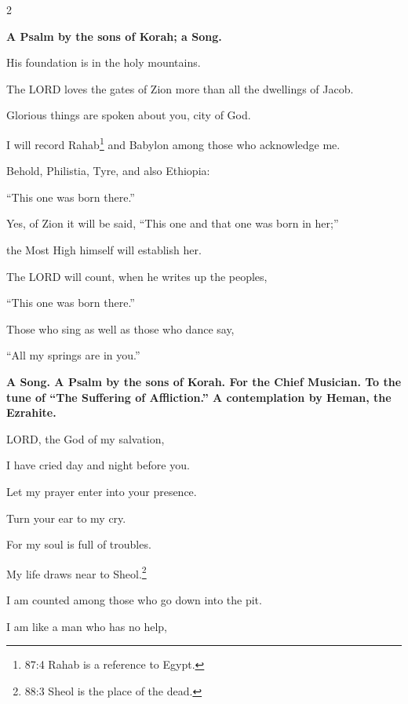\begin{multicols}{2}
	
	\mychapter{}\textbf{A Psalm by the sons of Korah; a Song.}
	
	\quad \myverse*{}His foundation is in the holy mountains.
	
	\myverse{}The LORD loves the gates of Zion more than all the
	dwellings of Jacob.
	
	\myverse{}Glorious things are spoken about you, city of God.
	
	\vspace{\baselineskip}
	
	\myverse{}I will record Rahab\footnote{87:4 Rahab is a reference to Egypt.} and Babylon among those who acknowledge me.
	
	Behold, Philistia, Tyre, and also Ethiopia:
	
	“This one was born there.”

	\vspace{\baselineskip}
	
	\myverse{}Yes, of Zion it will be said, “This one and that one was born
	in her;”
	
	the Most High himself will establish her.
	
	
	\myverse{}The LORD will count, when he writes up the peoples,
	
	“This one was born there.”
	
	\vspace{\baselineskip}
	
	
	\myverse{}Those who sing as well as those who dance say,
	
	“All my springs are in you.”
	
	
	\mychapter{}\textbf{A Song. A Psalm by the sons of Korah. For the Chief Musician. To the tune of “The Suffering
		of Affliction.” A contemplation by Heman, the Ezrahite.}
	
	\myverse*{}LORD, the God of my salvation,
	
	I have cried day and night before you.
	
	
	\myverse{}Let my prayer enter into your presence.
	
	Turn your ear to my cry.
	
	
	\myverse{}For my soul is full of troubles.
	
	My life draws near to Sheol.\footnote{88:3 Sheol is the place of the dead.}
	
	
	\myverse{}I am counted among those who go down into the pit.
	
	I am like a man who has no help,
	

\end{multicols}

